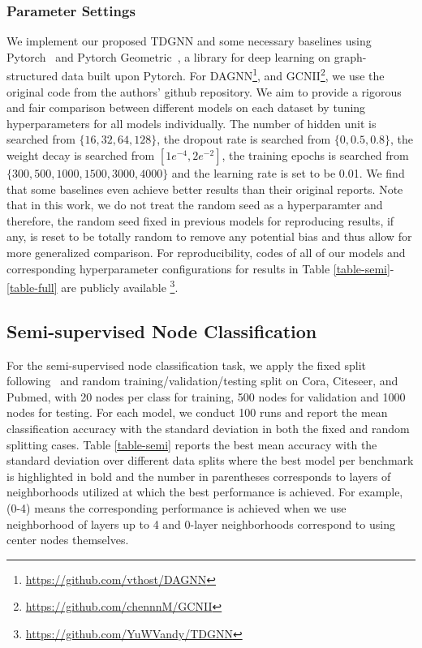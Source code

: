 \subsubsection{Parameter Settings}
We implement our proposed TDGNN and some necessary baselines using Pytorch~\cite{pytorch} and Pytorch Geometric~\cite{paszke2019pytorch}, a library for deep learning on graph-structured data built upon Pytorch. For DAGNN\footnote{\url{https://github.com/vthost/DAGNN}}, and GCNII\footnote{\url{https://github.com/chennnM/GCNII}}, we use the original code from the authors' github repository. We aim to provide a rigorous and fair comparison between different models on each dataset by tuning hyperparameters for all models individually. The number of hidden unit is searched from $\{16, 32, 64, 128\}$, the dropout rate is searched from $\{0, 0.5, 0.8\}$, the weight decay is searched from $[1e^{-4}, 2e^{-2}]$, the training epochs is searched from $\{300, 500, 1000, 1500, 3000, 4000\}$ and the learning rate is set to be 0.01. We find that some baselines even achieve better results than their original reports. Note that in this work, we do not treat the random seed as a hyperparamter and therefore, the random seed fixed in previous models for reproducing results, if any, is reset to be totally random to remove any potential bias and thus allow for more generalized comparison. For reproducibility, codes of all of our models and corresponding hyperparameter configurations for results in Table \ref{table-semi}-\ref{table-full} are publicly available \footnote{\url{https://github.com/YuWVandy/TDGNN}\label{github}}. 

\subsection{Semi-supervised Node Classification}
For the semi-supervised node classification task, we apply the fixed split following~\cite{yang2016revisiting} and random training/validation/testing split on Cora, Citeseer, and Pubmed, with 20 nodes per class for training, 500 nodes for validation and 1000 nodes for testing. For each model, we conduct 100 runs and report the mean classification accuracy with the standard deviation in both the fixed and random splitting cases. Table \ref{table-semi} reports the best mean accuracy with the standard deviation over different data splits where the best model per benchmark is highlighted in bold and the number in parentheses corresponds to layers of neighborhoods utilized at which the best performance is achieved. For example, (0-4) means the corresponding performance is achieved when we use neighborhood of layers up to 4 and $0$-layer neighborhoods correspond to using center nodes themselves.



